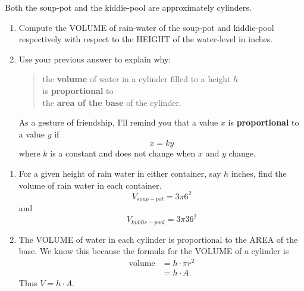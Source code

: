 \documentclass[nooutcomes,noauthor,hints,handout]{ximera}
\begin{document}
\begin{question}
  Both the soup-pot and the kiddie-pool are approximately cylinders.
  \begin{enumerate}
  \item Compute the VOLUME of rain-water of the soup-pot and
    kiddie-pool respectively with respect to the HEIGHT of the
    water-level in inches.
  \item Use your previous answer to explain why:
    \begin{quote}
      the \textbf{volume} of water in a cylinder filled to a height $h$ \\ \quad is
      \textbf{proportional} to \\
      \quad\quad the \textbf{area of the base} of the cylinder.
    \end{quote}
    As a gesture of friendship, I'll remind you that a value $x$ is
    \textbf{proportional} to a value $y$ if
  \[
  x = k y
  \]
  where $k$ is a constant and does not change when $x$ and $y$ change.
  \end{enumerate}
  \begin{freeResponse}
    \begin{enumerate}
      \item For a given height of rain water in either container, say
        $h$ inches, find the volume of rain water in each container.
        \[
        V_{soup-pot} = 3 \pi 6^2
        \]
        and
        \[
        V_{kiddie-pool} = 3 \pi 36^2 
        \]
      \item The VOLUME of water in each cylinder is proportional to
        the AREA of the base. We know this because the formula for the
        VOLUME of a cylinder is
        \begin{align*}
          \text{volume} &= h \cdot \pi r^2\\
          &= h \cdot A.
        \end{align*}
        Thus $V = h\cdot A$.
    \end{enumerate}
  \end{freeResponse}
\end{question}
\mynewpage
\end{document}
